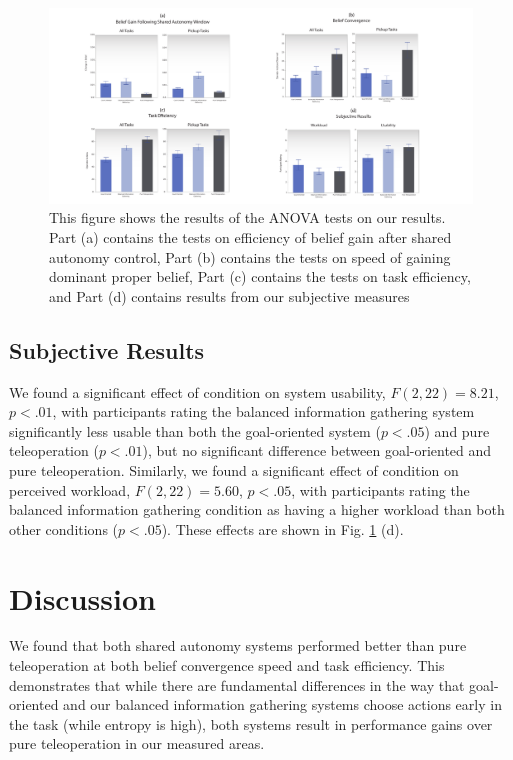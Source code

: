\documentclass[conference]{IEEEtran}
\begin{document}
\begin{figure}
\includegraphics[width=\textwidth]{figures/All_Measures.pdf}
\caption{This figure shows the results of the ANOVA tests on our results. Part (a) contains the tests on efficiency of belief gain after shared autonomy control, Part (b) contains the tests on speed of gaining dominant proper belief, Part (c) contains the tests on task efficiency, and Part (d) contains results from our subjective measures}
\label{picture_results}
\end{figure}

\subsection{Subjective Results}

We found a significant effect of condition on system usability, $F(2, 22) = 8.21$, $p < .01$, with participants rating the balanced information gathering system significantly less usable than both the goal-oriented system ($p < .05$) and pure teleoperation ($p < .01$), but no significant difference between goal-oriented and pure teleoperation. Similarly, we found a significant effect of condition on perceived workload, $F(2, 22) = 5.60$, $p < .05$, with participants rating the balanced information gathering condition as having a higher workload than both other conditions ($p < .05$). These effects are shown in Fig. \ref{picture_results} (d).

\section{Discussion}
We found that both shared autonomy systems performed better than pure teleoperation at both belief convergence speed and task efficiency. This demonstrates that while there are fundamental differences in the way that goal-oriented and our balanced information gathering systems choose actions early in the task (while entropy is high), both systems result in performance gains over pure teleoperation in our measured areas.
\end{document}
